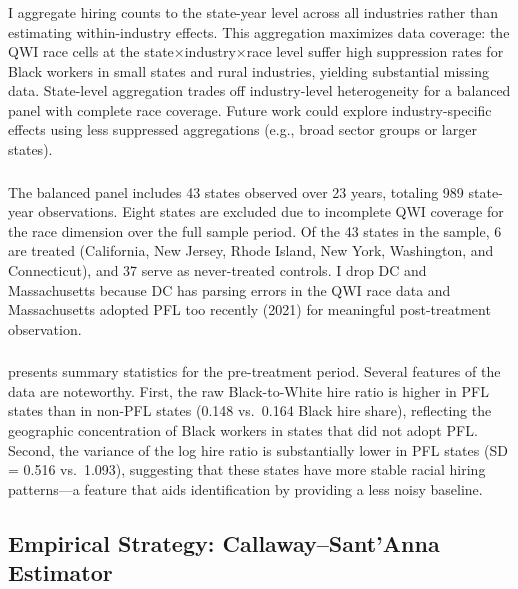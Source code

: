 \documentclass[12pt]{article}
\begin{document}
\subsubsection*{}
I aggregate hiring counts to the state-year level across all industries rather than estimating within-industry effects. This aggregation maximizes data coverage: the QWI race cells at the state×industry×race level suffer high suppression rates for Black workers in small states and rural industries, yielding substantial missing data. State-level aggregation trades off industry-level heterogeneity for a balanced panel with complete race coverage. Future work could explore industry-specific effects using less suppressed aggregations (e.g., broad sector groups or larger states).

\subsubsection*{}
The balanced panel includes 43 states observed over 23 years, totaling 989 state-year observations. Eight states are excluded due to incomplete QWI coverage for the race dimension over the full sample period. Of the 43 states in the sample, 6 are treated (California, New Jersey, Rhode Island, New York, Washington, and Connecticut), and 37 serve as never-treated controls. I drop DC and Massachusetts because DC has parsing errors in the QWI race data and Massachusetts adopted PFL too recently (2021) for meaningful post-treatment observation.

\subsubsection*{}
 presents summary statistics for the pre-treatment period. Several features of the data are noteworthy. First, the raw Black-to-White hire ratio is higher in PFL states than in non-PFL states (0.148 vs.\ 0.164 Black hire share), reflecting the geographic concentration of Black workers in states that did not adopt PFL. Second, the variance of the log hire ratio is substantially lower in PFL states (SD = 0.516 vs.\ 1.093), suggesting that these states have more stable racial hiring patterns---a feature that aids identification by providing a less noisy baseline.



\subsection{Empirical Strategy: Callaway--Sant'Anna Estimator}
\end{document}
